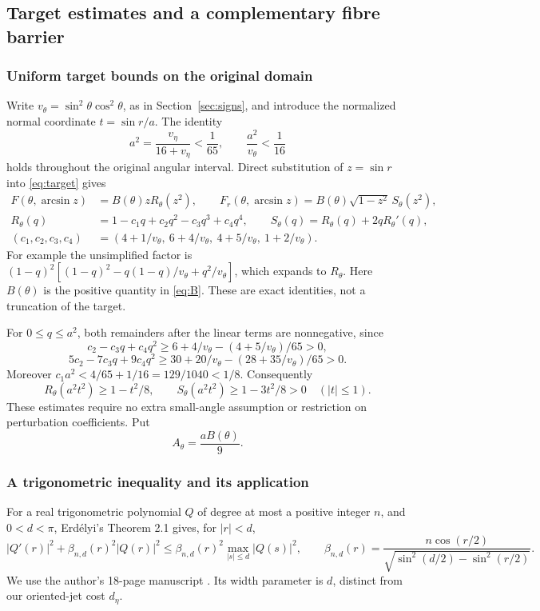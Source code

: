 \documentclass[11pt,a4paper]{article}
\begin{document}
\subsection{Target estimates and a complementary fibre barrier}\label{sec:barrier}

\subsubsection{Uniform target bounds on the original domain}
Write $v_\theta=\sin^2\theta\cos^2\theta$, as in Section~\ref{sec:signs},
and introduce the normalized normal coordinate $t=\sin r/a$.
The identity
\[
 a^2=\frac{v_\eta}{16+v_\eta}<\frac1{65},\qquad
 \frac{a^2}{v_\theta}<\frac1{16}
\]
holds throughout the original angular interval. Direct substitution of
$z=\sin r$ into \eqref{eq:target} gives
\begin{equation}\label{eq:RS}
 \begin{split}
 F(\theta,\arcsin z)&=B(\theta)zR_\theta(z^2),\qquad
 F_r(\theta,\arcsin z)=B(\theta)\sqrt{1-z^2}\,S_\theta(z^2),\\
 R_\theta(q)&=1-c_1q+c_2q^2-c_3q^3+c_4q^4,\qquad
 S_\theta(q)=R_\theta(q)+2qR_\theta'(q),\\
 (c_1,c_2,c_3,c_4)&=(4+1/v_\theta,\ 6+4/v_\theta,\
                         4+5/v_\theta,\ 1+2/v_\theta).
 \end{split}
\end{equation}
For example the unsimplified factor is
$(1-q)^2[(1-q)^2-q(1-q)/v_\theta+q^2/v_\theta]$, which expands
to $R_\theta$. Here $B(\theta)$ is the positive quantity in
\eqref{eq:B}. These are exact identities, not a truncation of the target.

For $0\le q\le a^2$, both remainders after the linear terms are
nonnegative, since
\[
 c_2-c_3q+c_4q^2\ge6+4/v_\theta-(4+5/v_\theta)/65>0,
\]
\[
 5c_2-7c_3q+9c_4q^2\ge30+20/v_\theta-(28+35/v_\theta)/65>0.
\]
Moreover $c_1a^2<4/65+1/16=129/1040<1/8$. Consequently
\begin{equation}\label{eq:RSbounds}
 R_\theta(a^2t^2)\ge1-t^2/8,\qquad
 S_\theta(a^2t^2)\ge1-3t^2/8>0\quad(|t|\le1).
\end{equation}
These estimates require no extra small-angle assumption or restriction
on perturbation coefficients. Put
\begin{equation}\label{eq:Atheta}
 A_\theta=\frac{aB(\theta)}9.
\end{equation}

\subsubsection{A trigonometric inequality and its application}
For a real trigonometric polynomial $Q$ of degree at most a positive integer $n$,
and $0<d<\pi$, Erd\'elyi's Theorem 2.1 gives, for $|r|<d$,
\begin{equation}\label{eq:erdelyi}
 |Q'(r)|^2+\beta_{n,d}(r)^2|Q(r)|^2
 \le\beta_{n,d}(r)^2\max_{|s|\le d}|Q(s)|^2,\qquad
 \beta_{n,d}(r)=\frac{n\cos(r/2)}
 {\sqrt{\sin^2(d/2)-\sin^2(r/2)}}.
\end{equation}
We use the author's 18-page manuscript \cite[Theorem 2.1, pp.~4--5;
proof, pp.~9--11]{Erdelyi}. Its width parameter is $d$, distinct from
our oriented-jet cost $d_\eta$.
\end{document}
